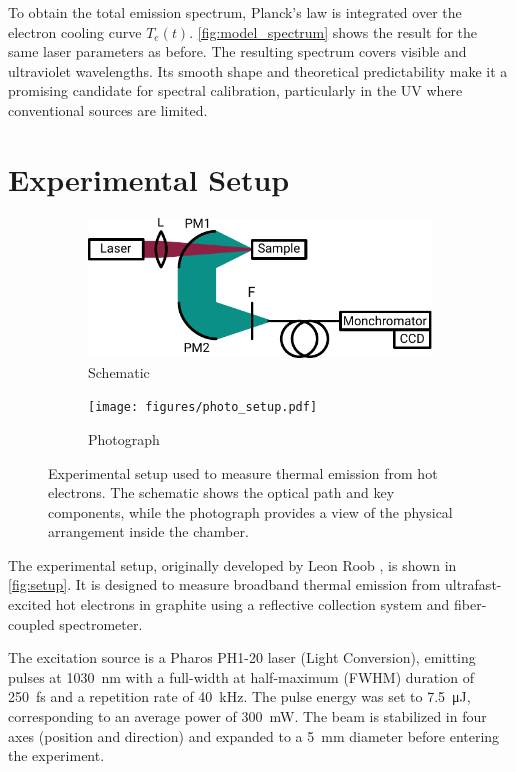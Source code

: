 \documentclass[
	parskip=half,
	a4paper,
]{scrarticle}
\begin{document}
To obtain the total emission spectrum, Planck's law is integrated over the electron cooling curve \( T_e(t) \). \autoref{fig:model_spectrum} shows the result for the same laser parameters as before. The resulting spectrum covers visible and ultraviolet wavelengths. Its smooth shape and theoretical predictability make it a promising candidate for spectral calibration, particularly in the UV where conventional sources are limited.


\section{Experimental Setup}

\begin{figure}
    \centering
    \begin{subfigure}{3.5in}
        \centering
        \includegraphics{figures/setup.pdf}
        \caption{Schematic}
    \end{subfigure}
    \hfill
    \begin{subfigure}{2in}
        \centering
        \texttt{[image: figures/photo\_setup.pdf]}
        \caption{Photograph}
    \end{subfigure}
    \caption{Experimental setup used to measure thermal emission from hot electrons. The schematic shows the optical path and key components, while the photograph provides a view of the physical arrangement inside the chamber.}
    \label{fig:setup}
\end{figure}

The experimental setup, originally developed by Leon Roob \cite{roob_thermal_2025}, is shown in \autoref{fig:setup}. It is designed to measure broadband thermal emission from ultrafast-excited hot electrons in graphite using a reflective collection system and fiber-coupled spectrometer.

The excitation source is a Pharos PH1-20 laser (Light Conversion), emitting pulses at \SI{1030}{nm} with a full-width at half-maximum (FWHM) duration of \SI{250}{\femto\second} and a repetition rate of \SI{40}{\kilo\hertz}. The pulse energy was set to \SI{7.5}{\micro\joule}, corresponding to an average power of \SI{300}{\milli\watt}. The beam is stabilized in four axes (position and direction) and expanded to a \SI{5}{\milli\meter} diameter before entering the experiment.
\end{document}
